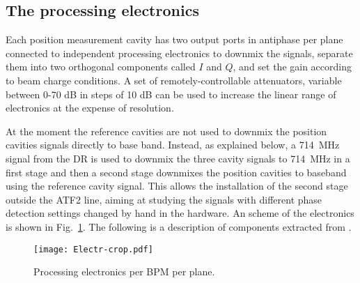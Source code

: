 \subsection{The processing electronics}\label{s:processing}
Each position measurement cavity has two output ports in antiphase per plane connected to independent processing electronics  to downmix the signals, separate them into two orthogonal components called $I$ and $Q$, and set the gain according to beam charge conditions. A set of remotely-controllable attenuators, variable between 0-70 dB in steps of 10 dB can be used to increase the linear range of electronics at the expense of resolution.\par
At the moment the reference cavities are not used to downmix the position cavities signals directly to base band. Instead, as explained below, a 714~MHz signal from the DR is used to downmix the three cavity signals to 714~MHz in a first stage and then a second stage downmixes the position cavities to baseband using the reference cavity signal. This allows the installation of the second stage outside the ATF2 line, aiming at studying the signals with different phase detection settings changed by hand in the hardware. An scheme of the electronics is shown in Fig.~\ref{f:elect}. The following is a description of components extracted from \cite{Nakathese}.\par
\begin{figure}[htb]
 \centering\hspace*{-1cm}
 \texttt{[image: Electr-crop.pdf]}\caption{Processing electronics per BPM per plane.}\label{f:elect}
\end{figure}
